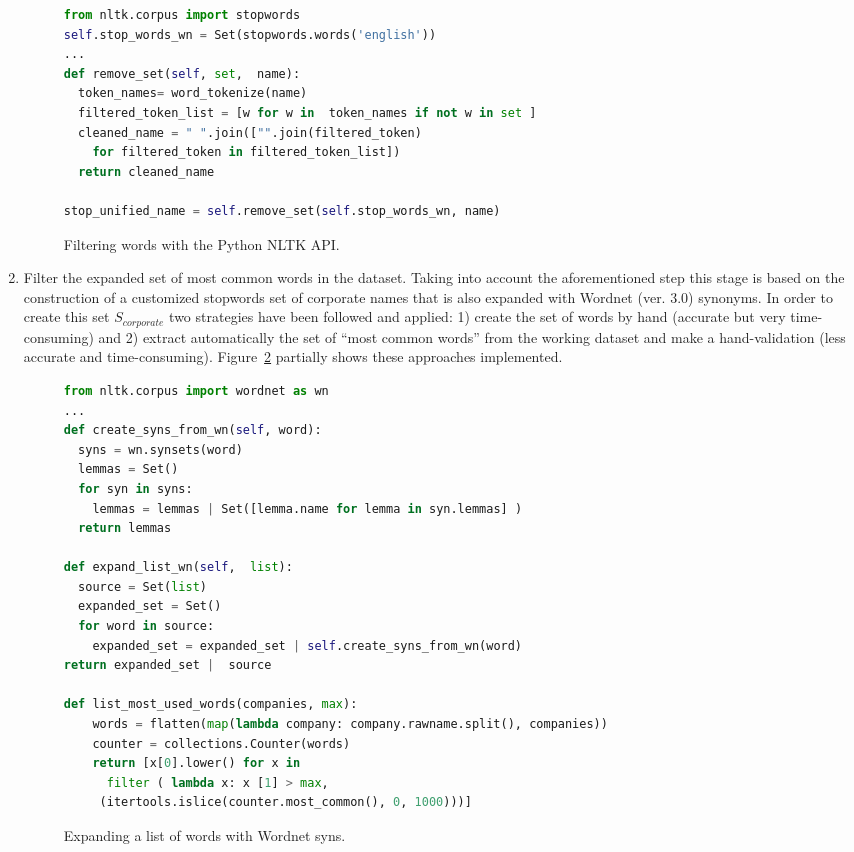 \documentclass{llncs}
\begin{document}
\begin{enumerate}
\begin{figure}[!h]
\begin{center}
\begin{lstlisting}[language=Python] 
from nltk.corpus import stopwords
self.stop_words_wn = Set(stopwords.words('english'))
...
def remove_set(self, set,  name): 
  token_names= word_tokenize(name)       
  filtered_token_list = [w for w in  token_names if not w in set ]
  cleaned_name = " ".join(["".join(filtered_token) 
    for filtered_token in filtered_token_list])
  return cleaned_name
  
stop_unified_name = self.remove_set(self.stop_words_wn, name)
\end{lstlisting}
\caption{Filtering words with the Python NLTK API.}
\label{figure:step-2}
\end{center}
\end{figure}

\item Filter the expanded set of most common words in the dataset. Taking into account 
the aforementioned step this stage is based on the construction of a customized stopwords 
set of corporate names that is also expanded with Wordnet (ver. 3.0) synonyms. In order 
to create this set $S_{corporate}$ two strategies have been followed and applied: 1) create the set 
of words by hand (accurate but very time-consuming) and 2) extract automatically the set of ``most common words'' from the 
working dataset and make a hand-validation (less accurate and time-consuming). Figure~\ref{figure:step-3} partially 
shows these approaches implemented.
    
\begin{figure}[!h]
\begin{center}
\begin{lstlisting}[language=Python]  
from nltk.corpus import wordnet as wn
...
def create_syns_from_wn(self, word):
  syns = wn.synsets(word) 
  lemmas = Set()
  for syn in syns:
    lemmas = lemmas | Set([lemma.name for lemma in syn.lemmas] )
  return lemmas

def expand_list_wn(self,  list):    
  source = Set(list)
  expanded_set = Set()
  for word in source:
    expanded_set = expanded_set | self.create_syns_from_wn(word)
return expanded_set |  source

def list_most_used_words(companies, max):
	words = flatten(map(lambda company: company.rawname.split(), companies))
	counter = collections.Counter(words)  
	return [x[0].lower() for x in 
	  filter ( lambda x: x [1] > max, 
	 (itertools.islice(counter.most_common(), 0, 1000)))]
\end{lstlisting}
\caption{Expanding a list of words with Wordnet syns.}
\label{figure:step-3}
\end{center}
\end{figure}


\end{enumerate}
\end{document}
